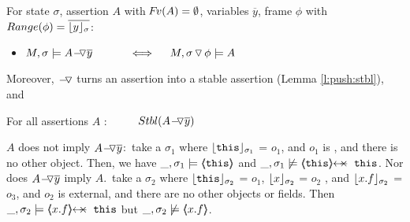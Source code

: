 \begin{lemma} 
\label{lemma:push:ass:state}
For   state  $\sigma$, assertion $A$ with $\fv(A)=\emptyset$,  variables   $\overline y$, frame $\phi$ with $Range (\phi)=\overline {\interpret \sigma y}$:


\begin{itemize} %
 \item
 \label{lemma:push:ass:state:one}
 \label{lemma:push:ass:state:two}
$M, \sigma \models \PushAS  {y} {A}\ \  \ \ \ \ \  \ \ \    \Longleftrightarrow  \ \ \ \ M,  \PushSLong {\phi} {\sigma}   \models A$
\end{itemize}  %
\end{lemma}


Moreover, $\FIXSymbolA$ turns an assertion into a stable assertion (Lemma \ref{l:push:stbl}), and 

\begin{lemma}
For all    assertions $A$ : \ \ \ \ \  $\Stable{ \PushAS y A}$
\label{l:push:stbl}
\end{lemma}


 

\begin{example}
\label{push:does:not:imply}
\notesep   $A$ does not imply $\PushAS {y} {A}$:\  \Eg  take 
  a   $\sigma_1$ where $\interpret {\sigma_1} {\prg{this}}$ = $o_1$, and $o_1$ is ,  and there is no other object. Then, we have
$\_,\sigma_1 \models \inside {\prg{this}}$ and $\_,\sigma_1 \not\models \protectedFrom {\prg{this}} {\prg{this}}$.
\notesep Nor does  $\PushAS {y} {A}$  imply $A$.\  \Eg  take a $\sigma_2$ where $\interpret {\sigma_2} {\prg{this}}$ = $o_1$,
 $\interpret {\sigma_2} {x}$ = $o_2$ , and  $\interpret {\sigma_2} {x.f}$ = $o_3$, and $o_2$ is external, and there are no other objects or fields.
 Then $\_,\sigma_2 \models   \protectedFrom {x.f} {\prg{this}}$ but  $\_,\sigma_2 \not\models \inside {x.f}$.
\end{example}






